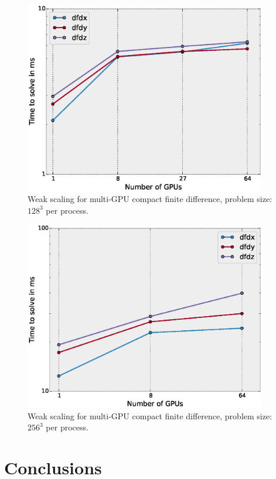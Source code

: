 \documentclass{elsarticle}
\begin{document}
\begin{figure}
\begin{center}
\includegraphics[width=300pt]{fig/weak-scaling-128.eps}
\caption{Weak scaling for multi-GPU compact finite difference, problem size: $128^3$ per process.}
\label{fig:weak-scaling-128}
\end{center}
\end{figure}

\begin{figure}
\begin{center}
\includegraphics[width=300pt]{fig/weak-scaling-256.eps}
\caption{Weak scaling for multi-GPU compact finite difference, problem size: $256^3$ per process.}
\label{fig:weak-scaling-256}
\end{center}
\end{figure}

\section{Conclusions}
\end{document}
